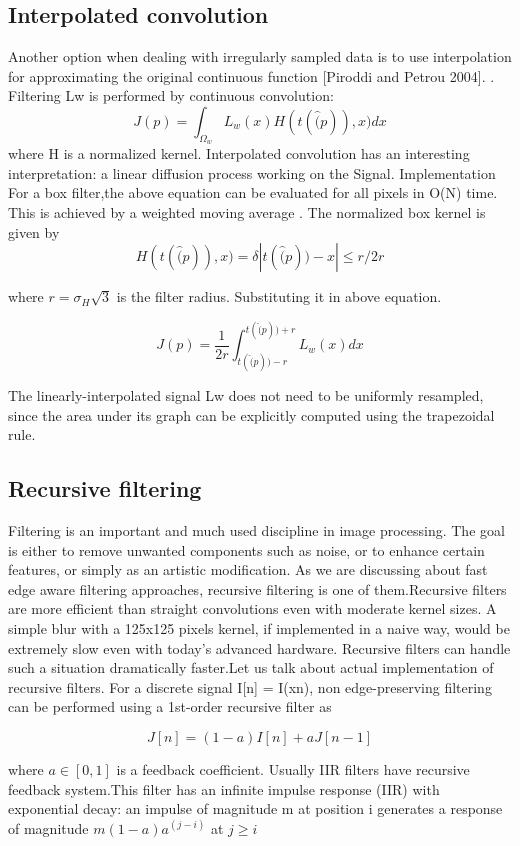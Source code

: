 \documentclass[conference]{IEEEtran}
\begin{document}
 
 
 \subsection{Interpolated convolution}
  Another option when dealing with irregularly sampled data is to use interpolation for approximating the original continuous function
[Piroddi and Petrou 2004]. . Filtering Lw is performed by continuous convolution:
$$J(p) = \int_{\Omega_w}L_w(x)H(t(\hat(p)),x) dx$$
where H is a normalized kernel. Interpolated convolution has an
interesting interpretation: a linear diffusion process working on the
Signal. Implementation For a box filter,the above equation can be evaluated
for all pixels in O(N) time. This is achieved by a weighted moving average
. The normalized box kernel is given by
$$H(t(\hat(p)),x) = \delta{|t(\hat(p))-x| \leq r}/2r$$

where $r = \sigma_H \sqrt{3}$ is the filter radius. Substituting it in above equation.

$$ J(p) = \frac{1}{2r}\int_{t(\hat(p))-r}^{t(\hat(p))+r} L_w(x) dx $$

The linearly-interpolated signal Lw does not need to be uniformly
resampled, since the area under its graph can be explicitly computed
using the trapezoidal rule.


  \subsection{Recursive filtering}
  	Filtering is an important and much used discipline in image processing. The goal is either to remove unwanted components such as noise, or to enhance certain features, or simply as an artistic modification. As we are discussing about fast edge aware filtering approaches, recursive filtering is one of them.Recursive filters are more efficient than straight convolutions even with moderate kernel sizes. A simple blur with a 125x125 pixels kernel, if implemented in a naive way, would be extremely slow even with today's advanced hardware. Recursive filters can handle such a situation dramatically faster.Let us talk about actual implementation of recursive filters.
For a discrete signal I[n] = I(xn),  non edge-preserving filtering can be performed using a 1st-order recursive filter as 

$$J[n] = (1 - a)  I[n] + a J[n - 1] $$

where $a \in [0, 1]$ is a feedback coefficient. Usually IIR filters have recursive feedback system.This filter has an infinite impulse response (IIR) with exponential decay: an impulse of magnitude m at position i generates a response of magnitude $m (1 - a) a^(j - i)$ at $j \geq  i$
\end{document}
